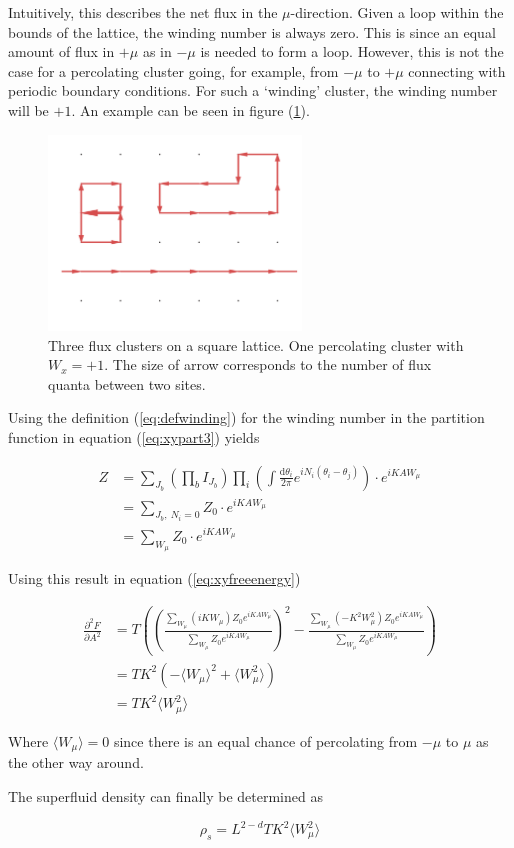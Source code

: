 Intuitively, this describes the net flux in the $\mu$-direction. Given a loop within the bounds of the lattice, the winding number is always zero. This is since an equal amount of flux in $+\mu$ as in $-\mu$ is needed to form a loop. However, this is not the case for a percolating cluster going, for example, from $-\mu$ to $+\mu$ connecting with periodic boundary conditions. For such a `winding' cluster, the winding number will be $+1$. An example can be seen in figure (\ref{fig:fluxpercolation}).

\begin{figure}[h!]
    \centering
        \includegraphics[width=0.6\textwidth]{figures/percolatingFlux.png}
    \caption{Three flux clusters on a square lattice. One percolating cluster with $W_x = +1$. The size of arrow corresponds to the number of flux quanta between two sites.}
    \label{fig:fluxpercolation}
\end{figure}

Using the definition (\ref{eq:defwinding}) for the winding number in the partition function in equation (\ref{eq:xypart3}) yields

\begin{align}
    Z &= \sum_{J_b} \left ( \prod_b I_{J_b} \right ) \prod_i \left ( \int \frac{\mathrm d \theta_i}{2 \pi} e^{i N_i (\theta_i - \theta_j)} \right ) \cdot e^{i K A W_\mu} \\
    &= \sum_{J_b, \ N_i = 0} Z_0 \cdot e^{i K A W_\mu} \\
    &= \sum_{W_\mu} Z_0 \cdot e^{i K A W_\mu}
\end{align}

Using this result in equation (\ref{eq:xyfreeenergy})

\begin{align}
    \frac{\partial^2 F}{\partial A^2} &= T \left ( \left ( \frac{\sum_{W_\mu} (i K W_\mu) Z_0 e^{iKAW_\mu}}{\sum_{W_\mu} Z_0 e^{iKAW_\mu}} \right )^2 - \frac{\sum_{W_\mu} (- K^2 W_\mu^2) Z_0 e^{iKAW_\mu}}{\sum_{W_\mu} Z_0 e^{iKAW_\mu}} \right ) \\
%
    &= T K^2 \left ( -\langle W_\mu \rangle^2 + \langle W_\mu^2 \rangle \right ) \\
%
    &= T K^2 \langle W_\mu^2 \rangle
\end{align}

Where $\langle W_\mu \rangle = 0$ since there is an equal chance of percolating from $-\mu$ to $\mu$ as the other way around.

The superfluid density can finally be determined as

\begin{equation}
    \rho_s = L^{2 - d} T K^2 \langle W_\mu^2 \rangle 
\end{equation}

